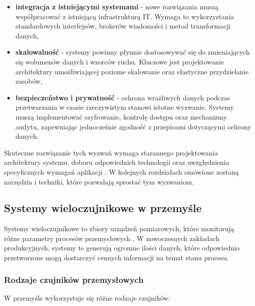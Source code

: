 \begin{itemize}
    \item \textbf{integracja z istniejącymi systemami} - nowe rozwiązania muszą współpracować z istniejącą infrastrukturą IT. Wymaga to wykorzystania standardowych interfejsów, brokerów wiadomości i metod transformacji danych,
    
    \item \textbf{skalowalność} - systemy powinny płynnie dostosowywać się do zmieniających się wolumenów danych i wzorców ruchu. Kluczowe jest projektowanie architektury umożliwiającej poziome skalowanie oraz elastyczne przydzielanie zasobów,
    
    \item \textbf{bezpieczeństwo i prywatność} - ochrona wrażliwych danych podczas przetwarzania w czasie rzeczywistym stanowi istotne wyzwanie. Systemy muszą implementować szyfrowanie, kontrolę dostępu oraz mechanizmy audytu, zapewniając jednocześnie zgodność z przepisami dotyczącymi ochrony danych.
\end{itemize}

Skuteczne rozwiązanie tych wyzwań wymaga starannego projektowania architektury systemu, doboru odpowiednich technologii oraz uwzględnienia specyficznych wymagań aplikacji \cite{geeksforgeeks_realtime}. W kolejnych rozdziałach omówione zostaną narzędzia i techniki, które pozwalają sprostać tym wyzwaniom.

\subsection{Systemy wieloczujnikowe w przemyśle}
\label{subsec:systemy_wieloczujnikowe}

Systemy wieloczujnikowe to zbiory urządzeń pomiarowych, które monitorują różne parametry procesów przemysłowych \cite{multisensor_systems}.
W nowoczesnych zakładach produkcyjnych, systemy te generują ogromne ilości danych, które odpowiednio przetworzone mogą
dostarczyć cennych informacji na temat stanu procesu.

\subsubsection{Rodzaje czujników przemysłowych}
\label{subsubsec:rodzaje_czujnikow}

W przemyśle wykorzystuje się różne rodzaje czujników:

